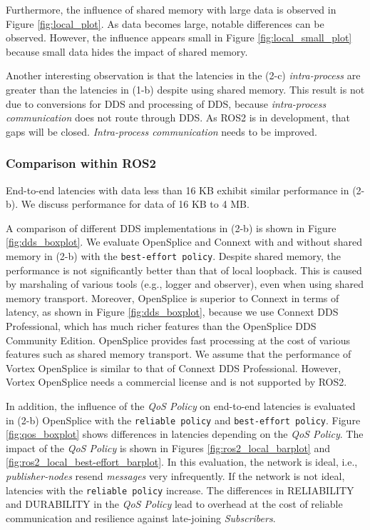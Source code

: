 \documentclass{sig-alternate-05-2015}
\begin{document}
Furthermore, the influence of shared memory with large data is observed in Figure \ref{fig:local_plot}.
As data becomes large, notable differences can be observed.
However, the influence appears small in Figure \ref{fig:local_small_plot} because small data hides the impact of shared memory.

Another interesting observation is that the latencies in the (2-c) \emph{intra-process} are greater than the latencies in (1-b) despite using shared memory.
This result is not due to conversions for DDS and processing of DDS, because \emph{intra-process communication} does not route through DDS.
As ROS2 is in development, that gaps will be closed.
\emph{Intra-process communication} needs to be improved.

\subsubsection{Comparison within ROS2}
\label{sec:ros2}
End-to-end latencies with data less than 16 KB exhibit similar performance in (2-b).
We discuss performance for data of 16 KB to 4 MB.

A comparison of different DDS implementations in (2-b) is shown in Figure \ref{fig:dds_boxplot}.
We evaluate OpenSplice and Connext with and without shared memory in (2-b) with the \texttt{best-effort policy}.
Despite shared memory, the performance is not significantly better than that of local loopback. 
This is caused by marshaling of various tools (e.g., logger and observer), even when using shared memory transport.
Moreover, OpenSplice is superior to Connext in terms of latency, as shown in Figure \ref{fig:dds_boxplot}, because we use Connext DDS Professional, which has much richer features than the OpenSplice DDS Community Edition.
OpenSplice provides fast processing at the cost of various features such as shared memory transport.
We assume that the performance of Vortex OpenSplice is similar to that of Connext DDS Professional.
However, Vortex OpenSplice needs a commercial license and is not supported by ROS2.

In addition, the influence of the \emph{QoS Policy} on end-to-end latencies is evaluated in (2-b) OpenSplice with the \texttt{reliable policy} and \texttt{best-effort policy}.
Figure \ref{fig:qos_boxplot} shows differences in latencies depending on the \emph{QoS Policy}.
The impact of the \emph{QoS Policy} is shown in Figures \ref{fig:ros2_local_barplot} and \ref{fig:ros2_local_best-effort_barplot}.
In this evaluation, the network is ideal, i.e., \emph{publisher-nodes} resend \emph{messages} very infrequently.
If the network is not ideal, latencies with the \texttt{reliable policy} increase.
The differences in RELIABILITY and DURABILITY in the \emph{QoS Policy} lead to overhead at the cost of reliable communication and resilience against late-joining \emph{Subscribers}.
\end{document}
